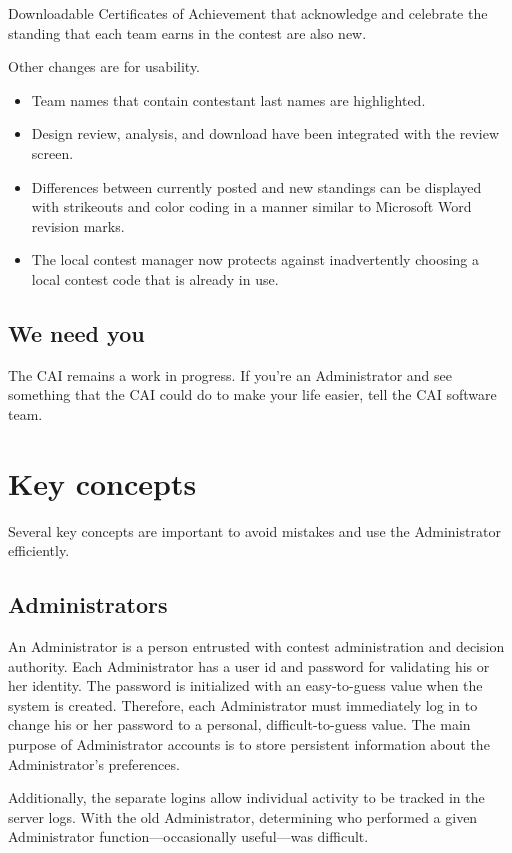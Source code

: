 \documentclass[11pt,letterpaper]{refart}
\begin{document}
Downloadable Certificates of Achievement that acknowledge and celebrate the standing 
that each team earns in the contest are also new. 

Other changes are for usability. 
\begin{itemize}
\item Team names that contain contestant last names are highlighted.
\item Design review, analysis, and download have been integrated with the review screen. 
\item Differences between currently posted and new standings can be displayed with 
  strikeouts and color coding in a manner similar to Microsoft Word revision marks. 
\item The local contest manager now protects against inadvertently choosing a local 
  contest code that is already in use.
\end{itemize}

\subsection{We need you}
The CAI remains a work in progress. If you're an Administrator and see something
that the CAI could do to make your life easier, tell the CAI software team.

\section{Key concepts}
Several key concepts are important to avoid mistakes and use the Administrator
efficiently.

\subsection{Administrators}
An Administrator is a person entrusted with contest administration and decision authority. 
Each Administrator has a user id and password for validating his or her identity. The 
password is initialized with an easy-to-guess value when the system is 
created. Therefore, each Administrator must immediately log in to change his or her password 
to a personal, difficult-to-guess value. The main purpose of Administrator accounts is to
store persistent information about the Administrator's preferences. 

Additionally, the separate logins allow individual activity to be tracked in the server logs. 
With the old Administrator, determining who performed a given Administrator 
function---occasionally useful---was difficult.
\end{document}
